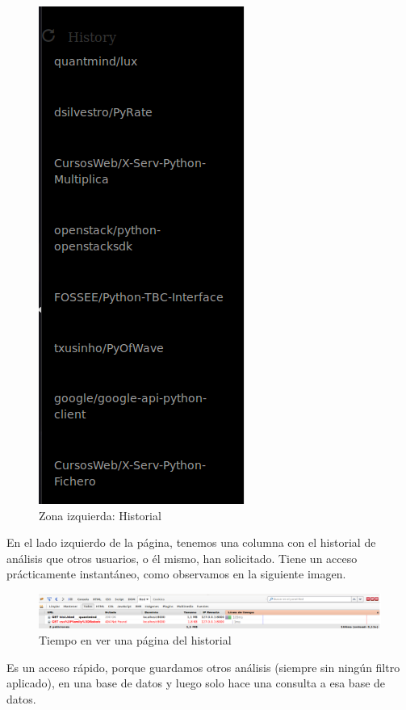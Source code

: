 \documentclass[a4paper, 12pt]{book}
\begin{document}
\begin{figure}[H]
\centering
\includegraphics[scale=0.35]{img/barrizq.png} 
\caption{Zona izquierda: Historial}
\end{figure}

En el lado izquierdo de la página, tenemos una columna con el historial de análisis que otros usuarios, o él mismo, han solicitado. Tiene un acceso prácticamente instantáneo, como observamos en la siguiente imagen.

\begin{figure}[H]
\centering
\includegraphics[scale=0.35]{img/tiempoHist.png} 
\caption{Tiempo en ver una página del historial}
\end{figure}

Es un acceso rápido, porque guardamos otros análisis (siempre sin ningún filtro aplicado), en una base de datos y luego solo hace una consulta a esa base de datos.
\end{document}
